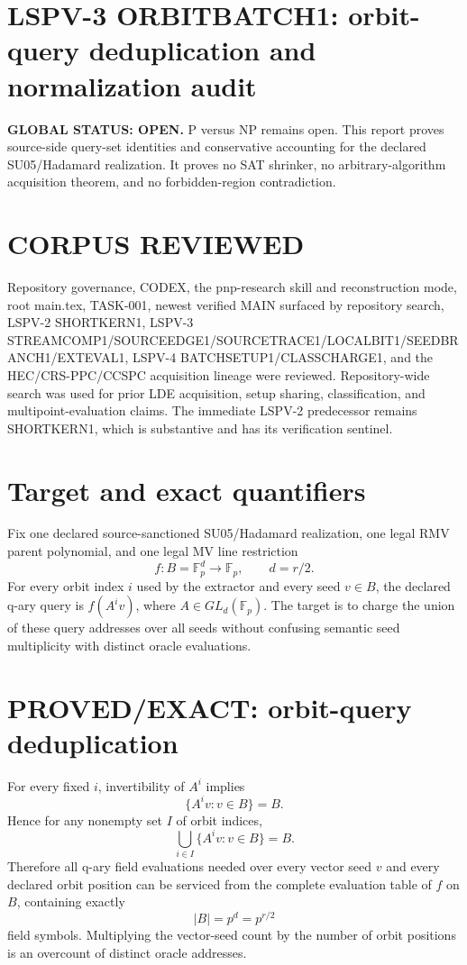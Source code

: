 \documentclass[11pt]{article}
\begin{document}
\section*{LSPV-3 ORBITBATCH1: orbit-query deduplication and normalization audit}
\textbf{GLOBAL STATUS: OPEN.} P versus NP remains open. This report proves source-side query-set identities and conservative accounting for the declared SU05/Hadamard realization. It proves no SAT shrinker, no arbitrary-algorithm acquisition theorem, and no forbidden-region contradiction.

\section*{CORPUS REVIEWED}
Repository governance, CODEX, the pnp-research skill and reconstruction mode, root main.tex, TASK-001, newest verified MAIN surfaced by repository search, LSPV-2 SHORTKERN1, LSPV-3 STREAMCOMP1/SOURCEEDGE1/SOURCETRACE1/LOCALBIT1/SEEDBRANCH1/EXTEVAL1, LSPV-4 BATCHSETUP1/CLASSCHARGE1, and the HEC/CRS-PPC/CCSPC acquisition lineage were reviewed. Repository-wide search was used for prior LDE acquisition, setup sharing, classification, and multipoint-evaluation claims. The immediate LSPV-2 predecessor remains SHORTKERN1, which is substantive and has its verification sentinel.

\section*{Target and exact quantifiers}
Fix one declared source-sanctioned SU05/Hadamard realization, one legal RMV parent polynomial, and one legal MV line restriction
\[
f:B=\mathbb F_p^d\to\mathbb F_p,\qquad d=r/2.
\]
For every orbit index \(i\) used by the extractor and every seed \(v\in B\), the declared q-ary query is \(f(A^iv)\), where \(A\in GL_d(\mathbb F_p)\). The target is to charge the union of these query addresses over all seeds without confusing semantic seed multiplicity with distinct oracle evaluations.

\section*{PROVED/EXACT: orbit-query deduplication}
For every fixed \(i\), invertibility of \(A^i\) implies
\[
\{A^iv:v\in B\}=B.
\]
Hence for any nonempty set \(I\) of orbit indices,
\[
\boxed{\bigcup_{i\in I}\{A^iv:v\in B\}=B.}
\]
Therefore all q-ary field evaluations needed over every vector seed \(v\) and every declared orbit position can be serviced from the complete evaluation table of \(f\) on \(B\), containing exactly
\[
|B|=p^d=p^{r/2}
\]
field symbols. Multiplying the vector-seed count by the number of orbit positions is an overcount of distinct oracle addresses.
\end{document}
